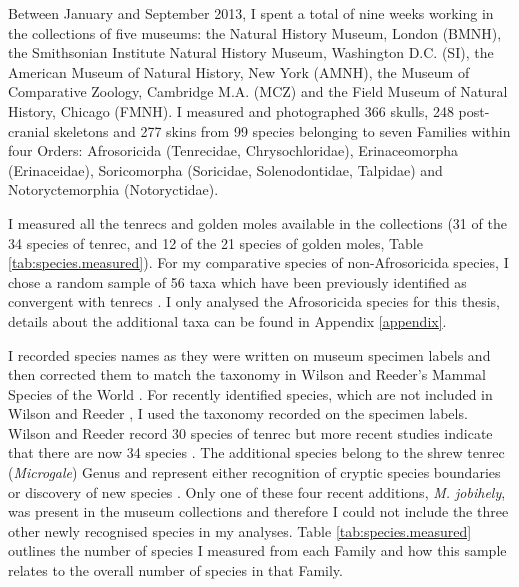 	Between January and September 2013, I spent a total of nine weeks working in the collections of five museums: the Natural History Museum, London (BMNH), the Smithsonian Institute Natural History Museum, Washington D.C. (SI), the American Museum of Natural History, New York (AMNH), the Museum of Comparative Zoology, Cambridge M.A. (MCZ) and the Field Museum of Natural History, Chicago (FMNH). I measured and photographed 366 skulls, 248 post-cranial skeletons and 277 skins from 99 species belonging to seven Families within four Orders: Afrosoricida (Tenrecidae, Chrysochloridae), Erinaceomorpha (Erinaceidae), Soricomorpha (Soricidae, Solenodontidae, Talpidae) and Notoryctemorphia (Notoryctidae). 

	I measured all the tenrecs and golden moles available in the collections (31 of the 34 species of tenrec, and 12 of the 21 species of golden moles, Table \ref{tab:species.measured}). 
	For my comparative species of non-Afrosoricida species, I chose a random sample of 56 taxa which have been previously identified as convergent with tenrecs \citep[e.g.][]{Gould1966, Symonds2005, Poux2008, Olson2013}. I only analysed the Afrosoricida species for this thesis, details about the additional taxa can be found in Appendix \ref{appendix}.
	
	I recorded species names as they were written on museum specimen labels and then corrected them to match the taxonomy in Wilson and Reeder's Mammal Species of the World \citeyearpar{Wilson2005}. For recently identified species,  which are not included in Wilson and Reeder \citeyearpar{Wilson2005}, I used the taxonomy recorded on the specimen labels. Wilson and Reeder \citeyearpar{Wilson2005} record 30 species of tenrec but more recent studies indicate that there are now 34 species \citep[][Table \ref{tab:species.measured}]{Olson2013}. The additional species belong to the shrew tenrec (\textit{Microgale}) Genus and represent either recognition of cryptic species boundaries \citep{Olson2004} or discovery of new species \citep{Goodman2006, Olson2009}. Only one of these four recent additions, \textit{M. jobihely}, was present in the museum collections and therefore I could not include the three other newly recognised species in my analyses. Table \ref{tab:species.measured} outlines the number of species I measured from each Family and how this sample relates to the overall number of species in that Family.


